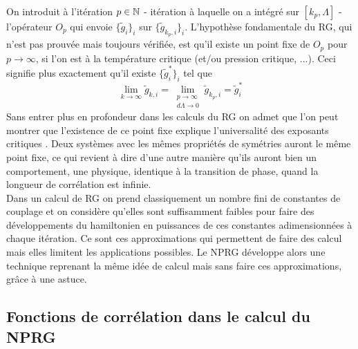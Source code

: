 \documentclass[10.5pt]{article}
\begin{document}
\begin{multicols}{2}
 
 
On introduit à l'itération $p \in \mathbb{N}$ - itération à laquelle on a intégré sur $[k_p, \Lambda]$ - l'opérateur $O_p$ qui envoie $\{\tilde{g}_i\}_i$ sur $\{\tilde{g}_{k_p,i}\}_i$. L'hypothèse fondamentale du RG, qui n'est pas prouvée mais toujours vérifiée, est qu'il existe un point fixe de $O_p$ pour $p \to \infty$, si l'on est à la température critique (et/ou pression critique, ...). Ceci signifie plus exactement qu'il existe $\{\tilde{g}^*_i\}_i$ tel que 
 \begin{equation}
 	\lim\limits_{k \rightarrow \infty}  \tilde{g}_{k,i} = \lim\limits_{\substack{p \to \infty \\ d\Lambda \to 0 }}  \tilde{g}_{k_p,i} =  \tilde{g}^*_i
 \end{equation} 
Sans entrer plus en profondeur dans les calculs du RG on admet que l'on peut montrer que l'existence de ce point fixe explique l'universalité des exposants critiques \cite{Delamotte2012}. Deux systèmes avec les mêmes propriétés de symétries auront le même point fixe, ce qui revient à dire d'une autre manière qu'ils auront bien un comportement, une physique, identique à la transition de phase, quand la longueur de corrélation est infinie. \\
 
Dans un calcul de RG on prend classiquement un nombre fini de constantes de couplage et on considère qu'elles sont suffisamment faibles pour faire des développements du hamiltonien en puissances de ces constantes adimensionnées à chaque itération. Ce sont ces approximations qui permettent de faire des calcul mais elles limitent les applications possibles. Le NPRG développe alors une technique reprenant la même idée de calcul mais sans faire ces approximations, grâce à une astuce.

\vspace*{11pt}




\subsection{Fonctions de corrélation dans le calcul du NPRG}
\label{ann:FuncCorrel}


\end{multicols}
\end{document}
